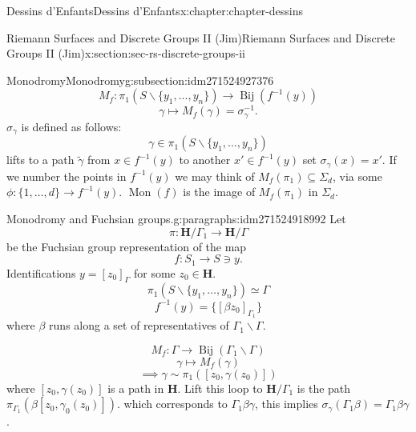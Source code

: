 \documentclass[oneside,10pt,]{book}
\numberwithin{equation}{section}
\newcommand{\inv}{^{-1}}
\newcommand{\lb}{[}
\newcommand{\rb}{]}
\newcommand{\HH}{\mathbf{H}}
\begin{document}
\begin{chapterptx}{Dessins d'Enfants}{}{Dessins d'Enfants}{}{}{x:chapter:chapter-dessins}
\begin{sectionptx}{Riemann Surfaces and Discrete Groups II (Jim)}{}{Riemann Surfaces and Discrete Groups II (Jim)}{}{}{x:section:sec-rs-discrete-groups-ii}
\begin{subsectionptx}{Monodromy}{}{Monodromy}{}{}{g:subsection:idm271524927376}
\begin{equation*}
M_f\colon \pi_1(S \smallsetminus \{y_1, \ldots, y_n\} )\to \operatorname{Bij} (f\inv (y))
\end{equation*}
%
\begin{equation*}
\gamma \mapsto M_f(\gamma) = \sigma_\gamma\inv\text{.}
\end{equation*}
\(\sigma_\gamma\) is defined as follows:%
\begin{equation*}
\gamma \in \pi_1(S\smallsetminus \{ y_1,\ldots, y_n\})
\end{equation*}
lifts to a path \(\widetilde \gamma\) from \(x\in f\inv(y)\) to another \(x' \in f\inv(y)\) set \(\sigma_\gamma(x) =x'\). If we number the points in \(f\inv (y)\) we may think of \(M_f(\pi_1)\subseteq \Sigma_d\), via some \(\phi\colon \{1,\ldots, d\}\to f\inv (y)\). \(\operatorname{Mon}(f)\) is the image of \(M_f(\pi_1)\) in \(\Sigma_d\).%
\begin{paragraphs}{Monodromy and Fuchsian groups.}{g:paragraphs:idm271524918992}%
Let%
\begin{equation*}
\pi \colon \HH/\Gamma_1 \to \HH/ \Gamma
\end{equation*}
be the Fuchsian group representation of the map%
\begin{equation*}
f\colon S_1 \to S\ni y\text{.}
\end{equation*}
Identifications \(y = \lb z_0 \rb_\Gamma\) for some \(z_0 \in \HH\).%
\begin{equation*}
\pi_1 (S\smallsetminus \{y_1,\ldots, y_n\}) \simeq \Gamma
\end{equation*}
%
\begin{equation*}
f\inv(y ) = \{ [\beta z_0]_{\Gamma_1}\}
\end{equation*}
where \(\beta\) runs along a set of representatives of \(\Gamma_1\backslash \Gamma\).%
\par
%
\begin{equation*}
M_f \colon \Gamma \to \operatorname{Bij} (\Gamma_1\backslash \Gamma)
\end{equation*}
%
\begin{equation*}
\gamma \mapsto M_f(\gamma)
\end{equation*}
%
\begin{equation*}
\implies \gamma \sim \pi_1([z_0,\gamma(z_0)])
\end{equation*}
where \(\lb z_0, \gamma(z_0) \rb\) is a path in \(\HH\). Lift this loop to \(\HH/\Gamma_1\) is the path \(\pi_{\Gamma_1}(\beta \lb z_0, \gamma_0(z_0)\rb)\). which corresponds to \(\Gamma_1 \beta \gamma\), this implies \(\sigma_\gamma(\Gamma_1\beta)  = \Gamma_1 \beta\gamma\).%

\end{paragraphs}
\end{subsectionptx}
\end{sectionptx}
\end{chapterptx}
\end{document}
